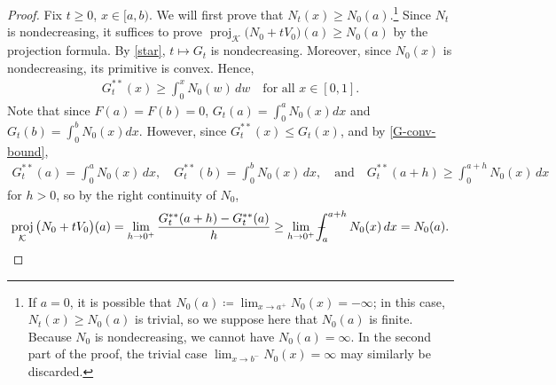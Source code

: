 \documentclass[10pt,a4paper]{amsart}
\numberwithin{equation}{section}
\def\Xint#1{\mathchoice
{\XXint\displaystyle\textstyle{#1}}%
{\XXint\textstyle\scriptstyle{#1}}%
{\XXint\scriptstyle\scriptscriptstyle{#1}}%
{\XXint\scriptscriptstyle\scriptscriptstyle{#1}}%
   \!\int}
\def\XXint#1#2#3{{\setbox0=\hbox{$#1{#2#3}{\int}$}
\vcenter{\hbox{$#2#3$}}\kern-.5\wd0}}
\def\dashint{\Xint-}
\DeclareMathOperator{\proj}{proj}
\begin{document}
\begin{proof}
Fix $t\geq0$, $x\in[a,b)$. We will first prove that $N_t(x)\geq N_0(a)$.\footnote{If $a=0$, it is possible that $N_0(a)\coloneq\lim_{x\to a^+}N_0(x)=-\infty$; in this case, $N_t(x)\geq N_0(a)$ is trivial, so we suppose here that $N_0(a)$ is finite. Because $N_0$ is nondecreasing, we cannot have $N_0(a)=\infty$. In the second part of the proof, the trivial case $\lim_{x\to b^-}N_0(x)=\infty$ may similarly be discarded.} Since $N_t$ is nondecreasing, it suffices to prove $\proj_\mathcal{K}\big(N_0+tV_0\big)(a)\geq N_0(a)$ by the projection formula. By \eqref{star}, $t\mapsto G_t$ is nondecreasing. Moreover, since $N_0(x)$ is nondecreasing, its primitive is convex. Hence, 
\begin{align}\label{G-conv-bound}
    G^{**}_t(x)\geq\int_0^x N_0(w) \, dw \quad \text{for all } x\in[0,1].
\end{align}
Note that since $F(a)=F(b)=0$, $G_t(a)=\int_0^a N_0(x)dx$ and $G_t(b)=\int_0^b N_0(x)dx$.
However, since $G_t^{**}(x)\leq G_t(x)$, and by \eqref{G-conv-bound},
\begin{align}\label{G-conv-endpoints}
    G_t^{**}(a)=\int_0^a N_0(x) \, dx, \quad  G_t^{**}(b)=\int_0^b N_0(x) \, dx, \quad \text{and} \quad G_t^{**}(a+h)\geq \int_0^{a+h} N_0(x) \, dx
\end{align}
for $h>0$, so by the right continuity of $N_0$,
\begin{align*}
    \proj_\mathcal{K}\big(N_0+tV_0\big)(a)=\lim_{h\to 0^+}\frac{G_t^{**}(a+h)-G_t^{**}(a)}{h}\geq\lim_{h\to 0^+}\dashint_a^{a+h} N_0(x) \, dx=N_0(a).
\end{align*}


\end{proof}
\end{document}
